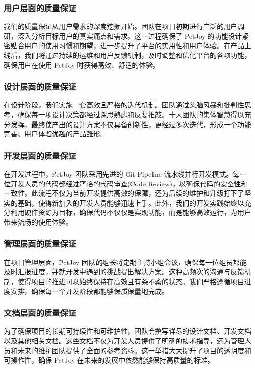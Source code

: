\subsubsection{用户层面的质量保证}
    
我们的质量保证从用户需求的深度挖掘开始。团队在项目初期进行广泛的用户调研，深入分析目标用户的真实痛点和需求。这一过程确保了 PetJoy 的功能设计紧密贴合用户的使用习惯和期望，进一步提升了平台的实用性和用户体验。在产品上线后，我们将通过持续的运维和用户反馈机制，及时调整和优化平台的各项功能，确保用户在使用 PetJoy 时获得高效、舒适的体验。
    
\subsubsection{设计层面的质量保证}
    
在设计阶段，我们实施一套高效且严格的迭代机制。团队通过头脑风暴和批判性思考，确保每一项设计决策都经过深思熟虑和反复推敲。十人团队的集体智慧得以充分发挥，最终使产出的设计方案不仅具备创新性，更经过多次迭代，形成一个功能完善、用户体验优越的产品雏形。
    
\subsubsection{开发层面的质量保证}
    
在开发过程中，PetJoy 团队采用先进的 Git Pipeline 流水线并行开发模式。每一位开发人员的代码都经过严格的代码审查(Code Review)，以确保代码的安全性和一致性。此流程不仅为当前开发提供高效的保障，还为后续的维护和升级打下了坚实的基础，使得新加入的开发人员能够迅速上手。此外，我们的开发实践始终以充分利用硬件资源为目标，确保代码不仅仅是实现功能，而是能够高效运行，为用户带来流畅的使用体验。
    
\subsubsection{管理层面的质量保证}
    
在项目管理层面，PetJoy 团队的组长将定期主持小组会议，确保每一位组员都能及时汇报进度，并就开发中遇到的挑战提出解决方案。这种高频次的沟通与反馈机制，使得项目的推进可以始终保持在高效且有条不紊的状态。我们严格遵循项目进度安排，确保每一个开发阶段都能够保质保量地完成。
    
\subsubsection{文档层面的质量保证}
    
为了确保项目的长期可持续性和可维护性，团队会撰写详尽的设计文档、开发文档以及其他相关文档。这些文档不仅为开发人员提供了明确的技术指导，还为管理人员和未来的维护团队提供了全面的参考资料。这一举措大大提升了项目的透明度和可操作性，确保 PetJoy 在未来的发展中依然能够保持高质量的标准。
    
